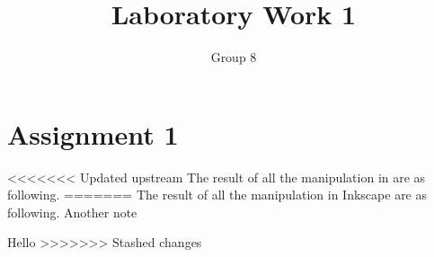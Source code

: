 \documentclass[11pt]{article}
\begin{document}
\author{Group 8}
\title{Laboratory Work 1}
\maketitle

\section{Assignment 1}
<<<<<<< Updated upstream
The result of all the manipulation in are as following.
=======
The result of all the manipulation in Inkscape are as following. Another note


Hello
>>>>>>> Stashed changes

\end{document}
